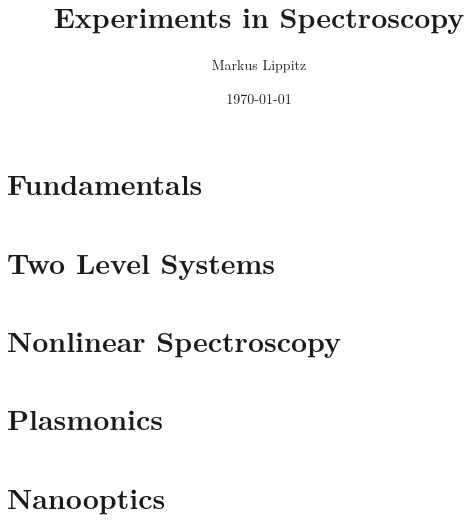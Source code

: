 \documentclass[notoc,nofonts,a4paper,twoside,nobib]{tufte-book}
\renewcommand{\chaptername}{Chapter\ }
\begin{document}
\sloppy

  \tikzexternaldisable


\title{Experiments in Spectroscopy}

\author{Markus Lippitz}
\date{\today}


\maketitle


%
\tableofcontents



%
\part{Fundamentals}






%
\part{Two Level Systems}





\part{Nonlinear Spectroscopy}






\part{Plasmonics}





%
%
\part{Nanooptics}
%

%
%
%
\renewcommand{\chaptername}{Appendix\ }

\appendix
\appendixpage

%






\printbibliography
\end{document}
